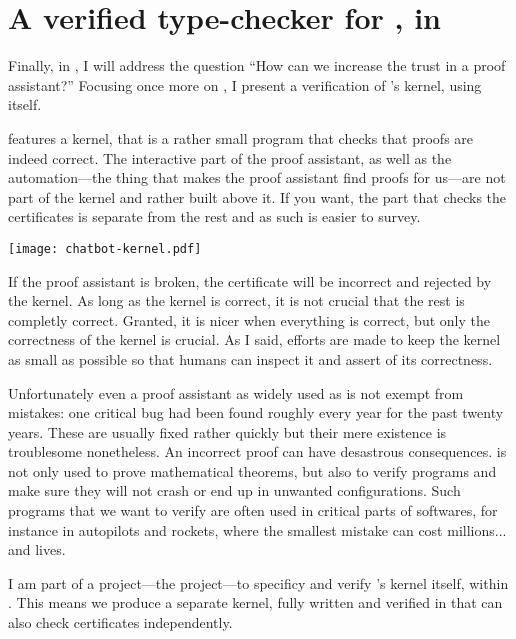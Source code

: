 \section{A verified type-checker for \Coq, in \Coq}

Finally, in , I will address the question ``How can we
increase the trust in a proof assistant?'' Focusing once more on \Coq, I present
a verification of \Coq's kernel, using \Coq itself.

\Coq features a kernel, that is a rather small program that checks that proofs
are indeed correct. The interactive part of the proof assistant, as well as the
automation---\ie the thing that makes the proof assistant find proofs for
us---are not part of the kernel and rather built above it.
If you want, the part that checks the certificates is separate from the rest
and as such is easier to survey.

\begin{center}
  \texttt{[image: chatbot-kernel.pdf]}
\end{center}

If the proof assistant is broken, the certificate will be incorrect and rejected
by the kernel. As long as the kernel is correct, it is not crucial that the rest
is completly correct. Granted, it is nicer when everything is correct, but only
the correctness of the kernel is crucial.
As I said, efforts are made to keep the kernel as small as possible so that
humans can inspect it and assert of its correctness.

Unfortunately even a proof assistant as widely used as \Coq is not exempt from
mistakes: one critical bug had been found roughly every year for the past twenty
years. These are usually fixed rather quickly but their mere existence is
troublesome nonetheless.
An incorrect proof can have desastrous consequences. \Coq is not only used to
prove mathematical theorems, but also to verify programs and make sure they will
not crash or end up in unwanted configurations. Such programs that we want to
verify are often used in critical parts of softwares, for instance in autopilots
and rockets, where the smallest mistake can cost millions... and lives.

I am part of a project---the \MetaCoq project---to specificy and verify \Coq's
kernel itself, within \Coq. This means we produce a separate kernel, fully
written and verified in \Coq that can also check certificates independently.


